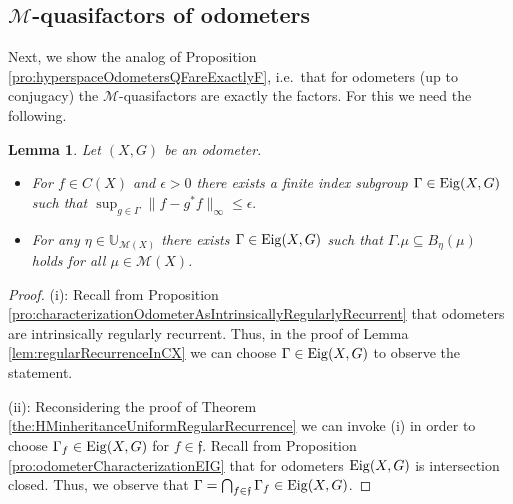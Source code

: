 \documentclass[12pt, reqno]{amsart}
\newtheorem{lemma}[theorem]{Lemma}
\theoremstyle{definition}
\theoremstyle{remark}
\numberwithin{equation}{section}
\theoremstyle{theorem}
\theoremstyle{remark}
\def\Eig{{\rm Eig}}
\begin{document}
\subsection{$\mathcal{M}$-quasifactors of odometers}
\label{subsec:inducedDynamicsOnTheRegularBorelProbabilityMeasures_MQuasifactorsOfOdometers}
Next, we show the analog of Proposition \ref{pro:hyperspaceOdometersQFareExactlyF}, i.e.\ that for odometers (up to conjugacy) the $\mathcal{M}$-quasifactors are exactly the factors.
For this we need the following. 

\begin{lemma}
\label{lem:odometerUniformRegularRecurrenceEigenvalueChoice}
    Let $(X,G)$ be an odometer. 
    \begin{itemize}
        \item[(i)] 
        For $f\in C(X)$ and $\epsilon>0$ there exists a finite index subgroup $\Gamma\in \Eig(X,G)$ such that $\sup_{g\in \Gamma} \|f-g^*f\|_\infty\leq \epsilon.$   
        \item[(ii)] 
        For any $\eta\in \mathbb{U}_{\mathcal{M}(X)}$ there exists $\Gamma\in \Eig(X,G)$ such that $\Gamma.\mu\subseteq B_\eta(\mu)$ holds for all $\mu\in  \mathcal{M}(X)$.
    \end{itemize}
\end{lemma}
\begin{proof}
(i): 
    Recall from Proposition \ref{pro:characterizationOdometerAsIntrinsicallyRegularlyRecurrent} that odometers are intrinsically regularly recurrent. 
    Thus, in the proof of Lemma \ref{lem:regularRecurrenceInCX} we can choose $\Gamma\in \Eig(X,G)$ to observe the statement. 

(ii): 
    Reconsidering the proof of Theorem \ref{the:HMinheritanceUniformRegularRecurrence} we can invoke (i) in order to choose $\Gamma_f\in \Eig(X,G)$ for $f\in \mathfrak{f}$.
    Recall from Proposition \ref{pro:odometerCharacterizationEIG} that for odometers $\Eig(X,G)$ is intersection closed. 
    Thus, we observe that $\Gamma=\bigcap_{f\in \mathfrak{f}}\Gamma_f\in \Eig(X,G)$. 
\end{proof}
\end{document}
